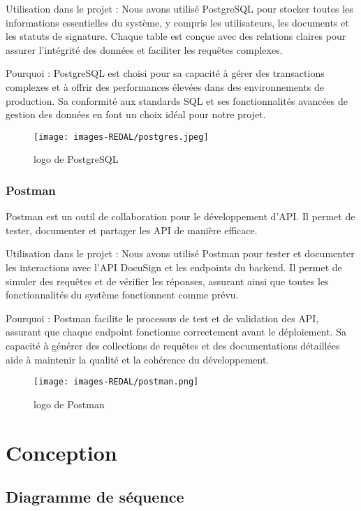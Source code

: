 Utilisation dans le projet : Nous avons utilisé PostgreSQL pour stocker toutes les informations essentielles du système, y compris les utilisateurs, les documents et les statuts de signature. Chaque table est conçue avec des relations claires pour assurer l'intégrité des données et faciliter les requêtes complexes.

Pourquoi : PostgreSQL est choisi pour sa capacité à gérer des transactions complexes et à offrir des performances élevées dans des environnements de production. Sa conformité aux standards SQL et ses fonctionnalités avancées de gestion des données en font un choix idéal pour notre projet.

\begin{figure}[H]
\begin{center}
\texttt{[image: images-REDAL/postgres.jpeg]}
\end{center}
\caption{logo de PostgreSQL}
\end{figure}


\subsubsection{Postman}
Postman est un outil de collaboration pour le développement d'API. Il permet de tester, documenter et partager les API de manière efficace.

Utilisation dans le projet : Nous avons utilisé Postman pour tester et documenter les interactions avec l'API DocuSign et les endpoints du backend. Il permet de simuler des requêtes et de vérifier les réponses, assurant ainsi que toutes les fonctionnalités du système fonctionnent comme prévu.

Pourquoi : Postman facilite le processus de test et de validation des API, assurant que chaque endpoint fonctionne correctement avant le déploiement. Sa capacité à générer des collections de requêtes et des documentations détaillées aide à maintenir la qualité et la cohérence du développement.

\begin{figure}[H]
\begin{center}
\texttt{[image: images-REDAL/postman.png]}
\end{center}
\caption{logo de Postman}
\end{figure}

\section{ Conception }
\subsection{Diagramme de séquence}

